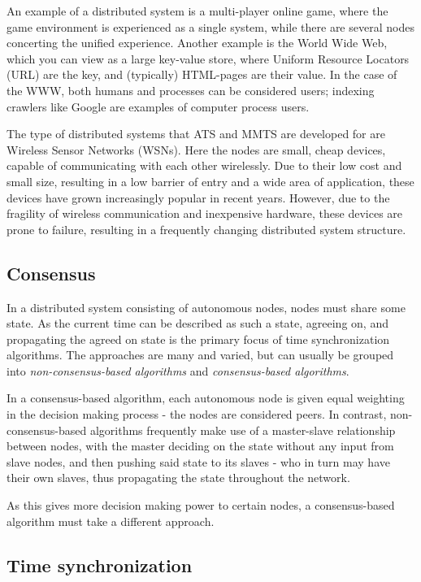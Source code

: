 \documentclass[a4paper,12pt]{article}
\begin{document}
An example of a distributed system is a multi-player online game, where
the game environment is experienced as a single system, while there
are several nodes concerting the unified experience.  Another example
is the World Wide Web, which you can view as a large key-value store,
where Uniform Resource Locators (URL) are the key, and (typically)
HTML-pages are their value.  In the case of the WWW, both humans and
processes can be considered users; indexing crawlers like Google are
examples of computer process users.

The type of distributed systems that ATS and MMTS are developed for are Wireless Sensor
Networks (WSNs). Here the nodes are small, cheap devices, capable of communicating with each other wirelessly. Due to their low cost and small size, resulting in a low barrier of entry and a wide area of application, these devices have grown increasingly popular in recent years. However, due to the fragility of wireless communication and inexpensive hardware, these devices are prone to failure, resulting in a frequently changing distributed system structure\cite{LucaFiorentin11}.

\subsection{Consensus}
In a distributed system consisting of autonomous nodes, nodes must share some state. As the current time can be described as such a state, agreeing on, and propagating the agreed on state is the primary focus of time synchronization algorithms. The approaches are many and varied, but can usually be grouped into \textit{non-consensus-based algorithms} and \textit{consensus-based algorithms}.

In a consensus-based algorithm, each autonomous node is given equal weighting in the decision making process - the nodes are considered peers. In contrast, non-consensus-based algorithms frequently make use of a master-slave relationship between nodes, with the master deciding on the state without any input from slave nodes, and then pushing said state to its slaves - who in turn may have their own slaves, thus propagating the state throughout the network.

As this gives more decision making power to certain nodes, a consensus-based algorithm must take a different approach.

\subsection{Time synchronization} %
\end{document}
